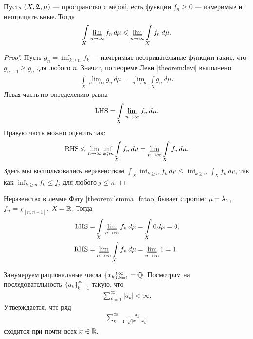 
\begin{thm}
 \label{theorem:lemma_fatoo}
 Пусть $(X, \mathfrak{A}, \mu)$ --- пространство с мерой, есть функции $f_n \geqslant 0$ --- измеримые и неотрицательные. Тогда \begin{align*}
  \int\limits_{X} \varliminf_{n\to \infty} f_n \, d\mu   \leqslant \varliminf_{n\to \infty} \int\limits_{X} f_n \, d\mu  
 .\end{align*} 
\end{thm}
\begin{proof}
 Пусть $g_n = \inf_{k \geqslant n} f_k$ --- измеримые неотрицательные функции такие, что $g_{n+1} \geqslant g_n$ для любого $n$. Значит, по теореме Леви \ref{theorem:levi} выполнено \begin{align*}
  \int\limits_{X} \lim_{n \to \infty} g_n \, d\mu  = \lim_{n \to \infty} \int\limits_{X} g_n \, d\mu   
 .\end{align*} Левая часть по определению равна \begin{align*}
 \mathrm{LHS} = \int\limits_{X} \varliminf_{n\to \infty} f_n \, d\mu  
 .\end{align*} Правую часть можно оценить так: \begin{align*}
 \mathrm{RHS} \leqslant \lim_{n \to \infty} \inf_{k\geqslant n} \int\limits_{X} f_n \, d\mu  = \varliminf_{n \to \infty} \int\limits_{X} f_n \, d\mu  
.\end{align*} Здесь мы воспользовались неравенством $\int_{X} \inf_{k\geqslant n} f_k \, d\mu  \leqslant \inf_{k \geqslant n} \int_{X} f_k \, d\mu  $, так как $\inf_{k \geqslant n} f_k \leqslant f_j$ для любого $j \leqslant n$.
\end{proof}
\begin{remrk}
 Неравенство в лемме Фату \ref{theorem:lemma_fatoo} бывает строгим: $\mu = \lambda_{1}$, $f_n = \chi_{[n, n + 1]}$, $X = \mathbb{R}$. Тогда \begin{align*}
  \mathrm{LHS} &= \int\limits_{X} \varliminf_{n \to \infty} f_n \, d\mu  = \int\limits_{X} 0 \, d\mu  = 0, \\
  \mathrm{RHS} &= \varliminf_{n \to \infty} \int\limits_{X} f_n \, d\mu  = \varliminf_{n \to \infty} 1 = 1
 .\end{align*} 
\end{remrk}
\begin{exmpl}
 Занумеруем рациональные числа $\{x_{k}\}_{k=1}^{\infty} = \mathbb{Q} $. Посмотрим на последовательность $\{a_{k}\}_{k=1}^{\infty} $ такую, что \begin{align*}
  \sum_{k=1}^{\infty} \left| a_k \right| < \infty
 .\end{align*} Утверждается, что ряд \begin{align*}
 \sum_{k=1}^{\infty} \frac{a_k}{\sqrt{\left| x - x_k \right|}}
 \end{align*} сходится при почти всех $x \in \mathbb{R}$.
\end{exmpl}
